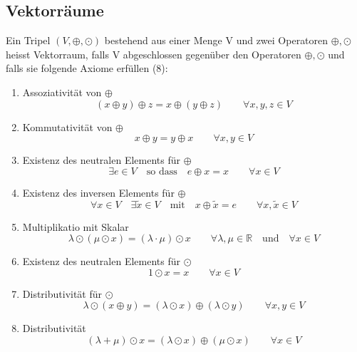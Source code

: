 \subsection{Vektorr\"aume}
Ein Tripel $(V, \oplus, \odot)$ bestehend aus einer Menge V und zwei Operatoren
$\oplus, \odot$ heisst Vektorraum, falls V abgeschlossen gegen\"uber den
Operatoren $\oplus, \odot$ und falls sie folgende Axiome erf\"ullen (8):
\begin{enumerate}
  \item Assoziativit\"at von $\oplus$
	\begin{equation}
	  (x \oplus y)\oplus z = x \oplus (y \oplus z) \qquad\forall x,y,z \in V
	\end{equation}
  \item Kommutativit\"at von $\oplus$
	\begin{equation}
	  x \oplus y = y \oplus x \qquad\forall x,y \in V
	\end{equation}
  \item Existenz des neutralen Elements f\"ur $\oplus$
	\begin{equation}
	  \exists e \in V \quad\text{so dass}\quad e \oplus x = x \qquad\forall x \in V
	\end{equation}
  \item Existenz des inversen Elements f\"ur $\oplus$
	\begin{equation}
	  \forall x \in V \quad \exists\widetilde{x} \in V \quad\text{mit}
		\quad x\oplus\widetilde{x} = e \qquad\forall x,\widetilde{x} \in V
	\end{equation}
  \item Multiplikatio mit Skalar
	\begin{equation}
	  \lambda \odot(\mu\odot x) = (\lambda\cdot\mu)\odot x
		\qquad\forall \lambda,\mu\in\mathbb{R}\quad\text{und}\quad\forall x \in V
	\end{equation}
  \item Existenz des neutralen Elements f\"ur $\odot$
	\begin{equation}
	  1 \odot x = x \qquad\forall x \in V
	\end{equation}
  \item Distributivit\"at f\"ur $\odot$
	\begin{equation}
	  \lambda\odot(x\oplus y) = (\lambda \odot x)\oplus(\lambda\odot y)
		\qquad\forall x,y \in V
	\end{equation}
  \item Distributivit\"at
	\begin{equation}
	  (\lambda + \mu)\odot x = (\lambda \odot x)\oplus(\mu \odot x)
		\qquad\forall x \in V
	\end{equation}
\end{enumerate}


